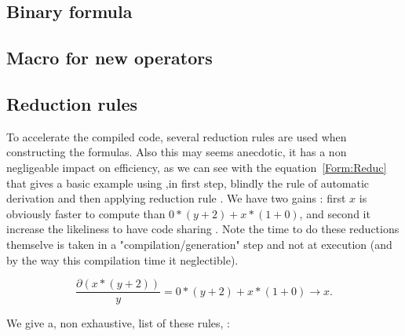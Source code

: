 \subsection{Binary formula}


\subsection{Macro for new operators}

\subsection{Reduction rules}

To accelerate the compiled code, several reduction rules are used when 
constructing the formulas. Also this may seems anecdotic,
it has a non negligeable  impact on efficiency, as we can see with the equation~\ref{Form:Reduc}
that gives a basic example using ,in first step, blindly the 
rule of automatic derivation and then applying reduction rule .
We have two gains : first $x$ is obviously faster to compute than $0 * (y+2) + x * (1 + 0)$,
and second it increase the likeliness to have code sharing . Note the time to do
these reductions themselve is taken in a "compilation/generation" step and not at execution
(and by the way this compilation time it neglectible).

\begin{equation}
	\frac{\partial(x*(y+2))}{y}
	=  0 * (y+2) + x * (1 + 0)
	\rightarrow x
	\label{Form:Reduc}.
\end{equation}

We give a, non exhaustive, list of these rules, :

